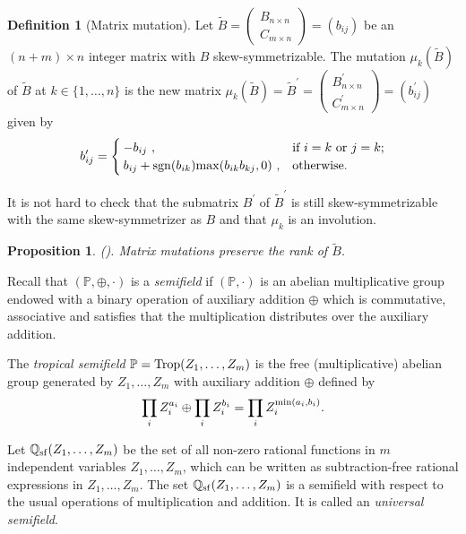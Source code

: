 \documentclass{amsart}
\newtheorem{proposition}[theorem]{Proposition}
\theoremstyle{definition}
\newtheorem{definition}[theorem]{Definition}
\theoremstyle{remark}
\numberwithin{equation}{section}
\begin{document}
\begin{definition}[Matrix mutation]
Let $\widetilde B=\begin{pmatrix}B_{n\times n}\\C_{m\times n}\end{pmatrix}=(b_{ij})$ be an $(n+m)\times n$ integer matrix with $B$ skew-symmetrizable. The mutation $\mu_k(\widetilde B)$ of $\widetilde B$ at $k\in\{1,\ldots,n\}$ is the new matrix $\mu_k(\widetilde B)=\widetilde B^\prime=
\begin{pmatrix}B_{n\times n}^\prime\\C_{m\times n}^\prime\end{pmatrix}=(b_{ij}^\prime)$ given by
\begin{eqnarray}
b_{ij}^{\prime}=\begin{cases}-b_{ij}~,&\text{if } i=k\text{ or } j=k;\\ b_{ij}+{\rm sgn}(b_{ik}){\rm max}(b_{ik}b_{kj},0)~,&\text{otherwise}.\end{cases}\nonumber
\end{eqnarray}
\end{definition}



It is not hard to check that the submatrix $B^\prime$ of $\widetilde B^\prime$ is still skew-symmetrizable with the same skew-symmetrizer as $B$ and that $\mu_k$ is an involution.

\begin{proposition}
{\rm (}\cite[Lemma 3.2]{BFZ}{\rm ).}
\label{prorank}
Matrix mutations preserve the rank of $\widetilde B$.
\end{proposition}


Recall that $(\mathbb P, \oplus, \cdot)$ is a {\em semifield} if $(\mathbb P,  \cdot)$ is an abelian multiplicative group endowed with a binary operation of auxiliary addition $\oplus$ which is commutative, associative and satisfies that the multiplication  distributes over the auxiliary addition.



The {\em tropical semifield} $\mathbb P={\rm Trop}(Z_1,\ldots,Z_m)$ is the free (multiplicative) abelian group generated by $Z_1,\ldots,Z_m$
with auxiliary addition $\oplus$ defined by
$$\prod\limits_{i}Z_i^{a_i}\oplus\prod\limits_{i}Z_i^{b_i}=\prod\limits_{i}Z_i^{{\rm min}(a_i,b_i)}.$$

Let $\mathbb Q_{\rm sf}(Z_1,\ldots,Z_m)$ be the set of all non-zero rational functions in
$m$ independent variables $Z_1,\ldots,Z_m$, which can be written as subtraction-free rational expressions in
$Z_1,\ldots,Z_m$.  The set $\mathbb Q_{\rm sf}(Z_1,\ldots,Z_m)$  is a semifield
with respect to the usual operations of multiplication and addition. It is called an {\em universal semifield}.
\end{document}
